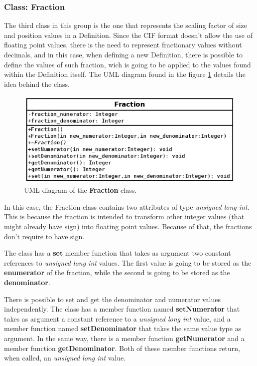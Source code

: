 \documentclass[11pt,twoside,openany,x11names,svgnames]{memoir}
\begin{document}
\clearpage

\subsubsection{Class: Fraction}\label{Class-Fraction}

The third class in this group is the one that represents the scaling factor of size and position values in a Definition. Since the CIF format doesn't allow the use of floating point values, there is the need to represent fractionary values without decimals, and in this case, when defining a new Definition, there is possible to define the values of such fraction, wich is going to be applied to the values found within the Definition itself. The UML diagram found in the figure \ref{fig:class-fraction} details the idea behind the class.

\begin{figure}
	\centering
	\includegraphics[scale=0.5, clip=true, trim= 0pt 0pt 0pt 0pt]{images/chapter03-image14}
	\caption{UML diagram of the \textbf{Fraction} class.}
	\label{fig:class-fraction}
\end{figure}

In this case, the Fraction class contains two attributes of type \textit{unsigned long int}. This is because the fraction is intended to transform other integer values (that might already have sign) into floating point values. Because of that, the fractions don't require to have sign.

The class has a \textbf{set} member function that takes as argument two constant references to \textit{unsigned long int} values. The first value is going to be stored as the \textbf{enumerator} of the fraction, while the second is going to be stored as the \textbf{denominator}.

There is possible to set and get the denominator and numerator values independently. The class has a member function named \textbf{setNumerator} that takes as argument a constant reference to a \textit{unsigned long int} value, and a member function named \textbf{setDenominator} that takes the same value type as argument. In the same way, there is a member function \textbf{getNumerator} and a member function \textbf{getDenominator}. Both of these member functions return, when called, an \textit{unsigned long int} value.
\end{document}
